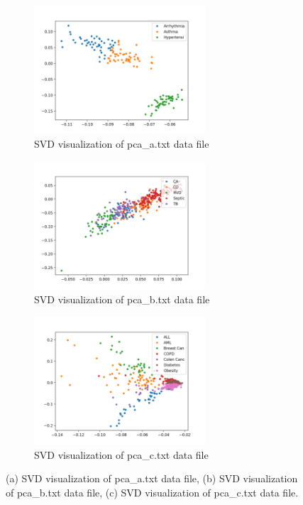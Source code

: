 \documentclass[fleqn]{llncs}
\begin{document}
\begin{figure}
	\centering
	\begin{subfigure}{1.0\textwidth}
		\centering\includegraphics[width=0.7\textwidth]{svda.png}
		\caption{SVD visualization of pca\_a.txt data file}
	\end{subfigure}
	\begin{subfigure}{1.0\textwidth}
		\centering\includegraphics[width=0.7\textwidth]{svdb.png}
		\caption{SVD visualization of pca\_b.txt data file}
	\end{subfigure}
	\begin{subfigure}{1.0\textwidth}
		\centering\includegraphics[width=0.7\textwidth]{svdc.png}
		\caption{SVD visualization of pca\_c.txt data file}
	\end{subfigure}
	\caption{(a) SVD visualization of pca\_a.txt data file, (b) SVD visualization of pca\_b.txt data file, (c) SVD visualization of pca\_c.txt data file.}
	\label{fig4}
\end{figure}
\end{document}
